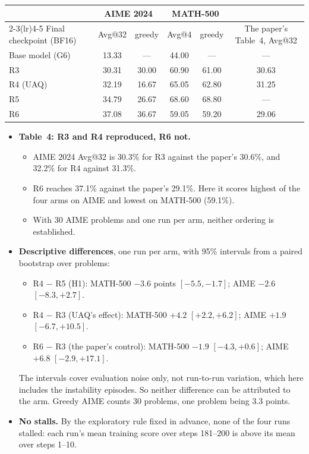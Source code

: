 \documentclass[11pt]{article}
\begin{document}
\begin{center}\small
\begin{tabular}{@{}l c c c c c@{}}
\toprule
& \multicolumn{2}{c}{AIME 2024} & \multicolumn{2}{c}{MATH-500} & \\
\cmidrule(lr){2-3}\cmidrule(lr){4-5}
Final checkpoint (BF16) & Avg@32 & greedy & Avg@4 & greedy & The paper's Table~4, Avg@32\\
\midrule
Base model (G6) & 13.33 & --- & 44.00 & --- & ---\\
R3 & 30.31 & 30.00 & 60.90 & 61.00 & 30.63\\
R4 (UAQ) & 32.19 & 16.67 & 65.05 & 62.80 & 31.25\\
R5 & 34.79 & 26.67 & 68.60 & 68.80 & ---\\
R6 & 37.08 & 36.67 & 59.05 & 59.20 & 29.06\\
\bottomrule
\end{tabular}
\end{center}
\begin{itemize}
\item \textbf{Table~4: R3 and R4 reproduced, R6 not.}
  \begin{itemize}
  \item AIME 2024 Avg@32 is 30.3\% for R3 against the paper's 30.6\%, and 32.2\% for R4 against 31.3\%.
  \item R6 reaches 37.1\% against the paper's 29.1\%. Here it scores highest of the four arms on AIME and lowest on MATH-500 (59.1\%).
  \item With 30 AIME problems and one run per arm, neither ordering is established.
  \end{itemize}
\item \textbf{Descriptive differences}, one run per arm, with 95\% intervals from a paired bootstrap over problems:
  \begin{itemize}
  \item R4 $-$ R5 (H1): MATH-500 $-3.6$ points $[-5.5,-1.7]$; AIME $-2.6$ $[-8.3,+2.7]$.
  \item R4 $-$ R3 (UAQ's effect): MATH-500 $+4.2$ $[+2.2,+6.2]$; AIME $+1.9$ $[-6.7,+10.5]$.
  \item R6 $-$ R3 (the paper's control): MATH-500 $-1.9$ $[-4.3,+0.6]$; AIME $+6.8$ $[-2.9,+17.1]$.
  \end{itemize}
  The intervals cover evaluation noise only, not run-to-run variation, which here includes the instability episodes. So neither difference can be attributed to the arm. Greedy AIME counts 30 problems, one problem being 3.3 points.
\item \textbf{No stalls.} By the exploratory rule fixed in advance, none of the four runs stalled: each run's mean training score over steps 181--200 is above its mean over steps 1--10.
\end{itemize}
\end{document}
